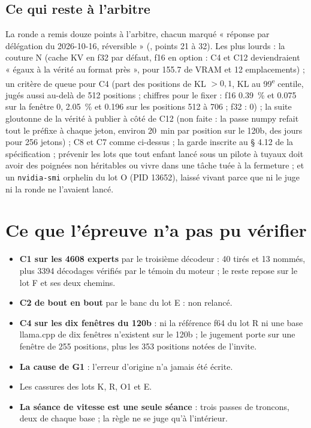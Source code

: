 \subsection{Ce qui reste à l'arbitre}\label{t2e-sec:arbitre}

La ronde a remis douze points à l'arbitre, chacun marqué « réponse par délégation du 2026-10-16, réversible » (, points 21 à 32). Les plus lourds : la couture N (cache KV en f32 par défaut, f16 en option : C4 et C12 deviendraient « égaux à la vérité au format près », pour \SI{155.7}{\Mo} de VRAM et 12 emplacements) ; un critère de queue pour C4 (part des positions de KL $> 0{,}1$, KL au 99\textsuperscript{e} centile, jugés aussi au-delà de 512 positions ; chiffres pour le fixer : f16 \SI{0.39}{\percent} et \num{0.075} sur la fenêtre 0, \SI{2.05}{\percent} et \num{0.196} sur les positions 512 à 706 ; f32 : 0) ; la suite gloutonne de la vérité à publier à côté de C12 (non faite : la passe numpy refait tout le préfixe à chaque jeton, environ \SI{20}{\minute} par position sur le 120b, des jours pour 256 jetons) ; C8 et C7 comme ci-dessus ; la garde inscrite au § 4.12 de la spécification ; prévenir les lots que tout enfant lancé sous un pilote à tuyaux doit avoir des poignées non héritables ou vivre dans une tâche tuée à la fermeture ; et un \texttt{nvidia-smi} orphelin du lot O (PID 13652), laissé vivant parce que ni le juge ni la ronde ne l'avaient lancé.

\section{Ce que l'épreuve n'a pas pu vérifier}\label{t2e-sec:non-verifie}

\begin{itemize}
\item \textbf{C1 sur les \num{4608} experts} par le troisième décodeur : 40 tirés et 13 nommés, plus \num{3394} décodages vérifiés par le témoin du moteur ; le reste repose sur le lot F et ses deux chemins.
\item \textbf{C2 de bout en bout} par le banc du lot E : non relancé.
\item \textbf{C4 sur les dix fenêtres du 120b} : ni la référence f64 du lot R ni une base llama.cpp de dix fenêtres n'existent sur le 120b ; le jugement porte sur une fenêtre de 255 positions, plus les 353 positions notées de l'invite.
\item \textbf{La cause de G1} : l'erreur d'origine n'a jamais été écrite.
\item Les cassures des lots K, R, O1 et E.
\item \textbf{La séance de vitesse est une seule séance} : trois passes de troncons, deux de chaque base ; la règle ne se juge qu'à l'intérieur.
\end{itemize}

